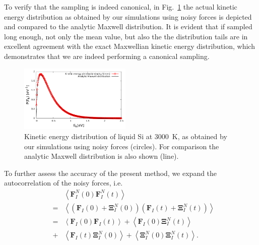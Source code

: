 \documentclass[format=acmsmall,review,timestamp,urlbreakonhyphens]{acmart}
\begin{document}
To verify that the sampling is indeed canonical, in Fig.~\ref{Fig3} the actual kinetic energy distribution as obtained by our simulations using noisy forces is depicted and compared to the analytic Maxwell distribution. It is evident that if sampled long enough, not only the mean value, but also the the distribution tails are in excellent agreement with the exact Maxwellian kinetic energy distribution, which demonstrates that we are indeed performing a canonical sampling.
\begin{figure}%
\begin{center}
\includegraphics[width=0.475\textwidth]
{figures/maxwelldistribution_new.pdf}
\end{center}
\caption{\label{Fig3}
Kinetic energy distribution of liquid Si at 3000~K, as obtained by our simulations using noisy forces (circles). For comparison the analytic Maxwell distribution is also shown (line).
} \end{figure}
To further assess the accuracy of the present method, we expand the autocorrelation of the noisy forces, i.e.
\begin{subequations}
\begin{eqnarray}
  && \left \langle \textbf{F}_{I}^{N}\left ( 0 \right )\textbf{F}_{I}^{N}\left ( t \right )\right \rangle \\
  &=& \left \langle \left ( \textbf{F}_{I}\left ( 0 \right ) + \mathbf{\Xi } _{I}^{N} \left(0 \right )\right) \left( \textbf{F}_{I}\left ( t \right )+\mathbf{\Xi } _{I}^{N}\left ( t \right )\right) \right \rangle \\
  &=& \left \langle \textbf{F}_{I}\left ( 0 \right ) \textbf{F}_{I}\left ( t \right )\right \rangle + \left \langle \textbf{F}_{I}\left ( 0 \right ) \mathbf{\Xi } _{I}^{N}\left(t \right )\right \rangle \label{AutoCorr} \\
  &+& \left \langle \textbf{F}_{I}\left ( t \right ) \mathbf{\Xi } _{I}^{N}\left(0 \right )\right \rangle + \left \langle \mathbf{\Xi } _{I}^{N}\left(0 \right ) \mathbf{\Xi } _{I}^{N}\left(t \right )\right \rangle.  \nonumber
\end{eqnarray}
\end{subequations}
\end{document}
